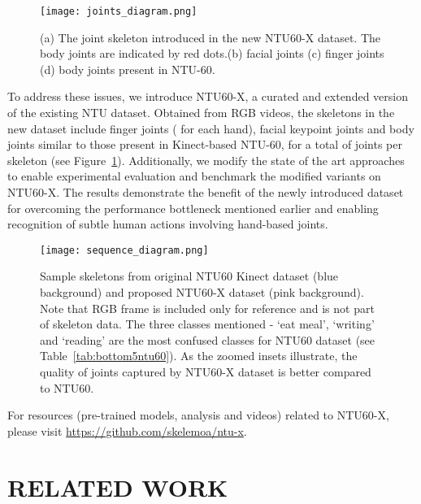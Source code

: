 \documentclass{article}
\begin{document}
\begin{figure}[!t]
    \centering
    \texttt{[image: joints\_diagram.png]}
    \caption{(a) The  joint skeleton introduced in the new NTU60-X dataset. The  body joints are indicated by red dots.(b)  facial joints (c)  finger joints (d)  body joints present in NTU-60.  }
    \label{fig:joints_fig}
\end{figure}

To address these issues, we introduce NTU60-X, a curated and extended version of the existing NTU  dataset. Obtained from RGB videos, the skeletons in the new dataset include  finger joints ( for each hand),  facial keypoint joints and  body joints similar to those present in Kinect-based NTU-60, for a total of  joints per skeleton (see Figure~\ref{fig:joints_fig}). Additionally, we modify the state of the art approaches to enable experimental evaluation and benchmark the modified variants on NTU60-X. The results demonstrate the benefit of the newly introduced dataset for overcoming the performance bottleneck mentioned earlier and enabling recognition of subtle human actions involving hand-based joints. 

\begin{figure*}[!t]
    \centering
    \texttt{[image: sequence\_diagram.png]}
    \caption{Sample skeletons from original NTU60 Kinect dataset (blue background) and proposed NTU60-X dataset (pink background). Note that RGB frame is included only for reference and is not part of skeleton data. The three classes mentioned - `eat meal', `writing' and `reading' are the most confused classes for NTU60 dataset (see Table~\ref{tab:bottom5ntu60}). As the zoomed insets illustrate, the quality of joints captured by NTU60-X dataset is better compared to NTU60.}
    \label{fig:seq_fig}
\end{figure*}

For resources (pre-trained models, analysis and videos) related to NTU60-X, please visit \url{https://github.com/skelemoa/ntu-x}.

\section{RELATED WORK}
\label{sec:related}
\end{document}

